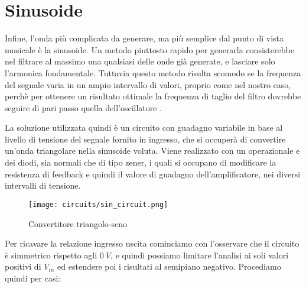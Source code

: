 
\section{Sinusoide}


Infine, l'onda più complicata da generare, ma più semplice dal punto di vista musicale è la
sinusoide. Un metodo piuttosto rapido per generarla consisterebbe nel filtrare al massimo una
qualsiasi delle onde già generate, e lasciare solo l'armonica fondamentale. Tuttavia questo
metodo risulta scomodo se la frequenza del segnale varia in un ampio intervallo di valori,
proprio come nel nostro caso, perchè per ottenere un risultato ottimale la frequenza di taglio
del filtro dovrebbe seguire di pari passo quella dell'oscillatore .

La soluzione utilizzata quindi è un circuito con guadagno variabile in base al livello di
tensione del segnale fornito in ingresso, che si occuperà di convertire un'onda triangolare
nella sinusoide voluta. Viene realizzato con un operazionale e dei diodi, sia normali che di
tipo zener, i quali si occupano di modificare la resistenza di feedback e quindi il valore di
guadagno dell'amplificatore, nei diversi intervalli di tensione.

\begin{figure}[H]
    \centering
    \texttt{[image: circuits/sin\_circuit.png]}
    \caption{Convertitore triangolo-seno}
    \label{sin_circuit}
\end{figure}

Per ricavare la relazione ingresso uscita cominciamo con l'osservare che il circuito è
simmetrico rispetto agli $0\ V$, e quindi possiamo limitare l'analisi ai soli valori positivi
di $V_{in}$ ed estendere poi i risultati al semipiano negativo. Procediamo quindi per casi:

